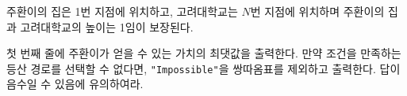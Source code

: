 \begin{problem}{\kcpcclimbingtitle}
    주환이의 집은 1번 지점에 위치하고, 고려대학교는 $ N $번 지점에 위치하며 주환이의 집과 고려대학교의 높이는 1임이 보장된다.
    
    \OutputFile
    첫 번째 줄에 주환이가 얻을 수 있는 가치의 최댓값을 출력한다. 만약 조건을 만족하는 등산 경로를 선택할 수 없다면, \verb|"Impossible"|을 쌍따옴표를 제외하고 출력한다. 답이 음수일 수 있음에 유의하여라.
    
    \Examples
    
    \begin{example}
    \end{example}
    
\end{problem}

